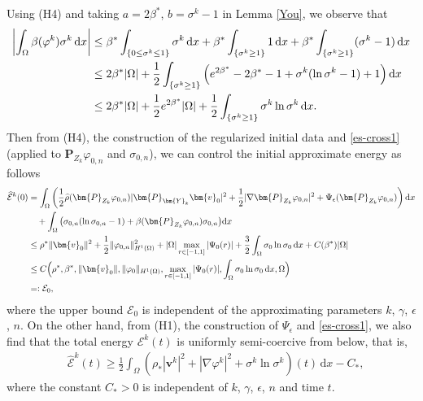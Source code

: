 \documentclass[11pt,reqno]{amsart}
\begin{document}
Using (H4) and taking $a=2\beta^*$, $b=\sigma^k-1$ in Lemma \ref{You}, we observe that
%
\begin{align}
\left|\int_\Omega \beta(\varphi^k) \sigma^k\,\mathrm{d}x\right|
&\leq \beta^*\int_{\{0\leq \sigma^k\leq 1\}} \sigma^k\,\mathrm{d}x
+ \beta^*\int_{\{\sigma^k\geq 1\}} 1\,\mathrm{d}x
+ \beta^*\int_{\{\sigma^k\geq 1\}} (\sigma^k-1)\,\mathrm{d}x
\notag \\
&\leq 2\beta^*|\Omega|
+ \frac{1}{2}\int_{\{\sigma^k\geq 1\}} \left(e^{2\beta^*}-2\beta^*-1 + \sigma^k
(\ln \sigma^k-1)+1\right)\mathrm{d}x
\notag\\
&\leq 2\beta^*|\Omega| + \frac{1}{2}e^{2\beta^*}|\Omega|
+ \frac{1}{2}\int_{\{\sigma^k\geq 1\}} \sigma^k
\ln \sigma^k\,\mathrm{d}x.
\label{es-cross1}
\end{align}
%
Then from (H4), the construction of the regularized initial data and \eqref{es-cross1} (applied to $\bm{P}_{Z_{k}} \varphi_{0,n}$ and $\sigma_{0,n}$), we can control the initial approximate energy as follows
%
\begin{align}
\widehat{\mathcal{E}}^k(0)
&=
\int_{\Omega}\left(\frac{1}{2}\widehat{\rho}(\bm{P}_{Z_{k}} \varphi_{0,n})|\bm{P}_{\bm{Y}_{k}} \bm{v}_{0}|^{2}
+\frac{1}{2}|\nabla \bm{P}_{Z_{k}}\varphi_{0,n}|^{2} +\Psi_\epsilon(\bm{P}_{Z_{k}}\varphi_{0,n})
 \right) \mathrm{d}x
\notag \\
&\quad +
\int_{\Omega}\big(
\sigma_{0,n}(\ln \sigma_{0,n}-1)
+ \beta(\bm{P}_{Z_{k}}\varphi_{0,n})\sigma_{0,n}\big) \mathrm{d}x
\notag \\
&\leq \rho^*\|\bm{v}_{0}\|^{2}
+ \frac12\|\varphi_{0,n}\|_{H^1(\Omega)}^2 + |\Omega|\max_{r\in[-1,1]}|\Psi_0(r)|
 + \frac{3}{2} \int_\Omega \sigma_0\ln \sigma_0\, \mathrm{d}x + C(\beta^*)  |\Omega|
\notag \\
&\le C\Big(\rho^*, \beta^*, \|  \bm{v}_{0}\|, \|\varphi_{0}\|_{H^1(\Omega)}, \max_{r\in[-1,1]}|\Psi_0(r)|,
\int_\Omega \sigma_0\ln \sigma_0\, \mathrm{d}x, \Omega\Big)
\notag\\
&=: \mathcal{E}_0,
\label{iniE0}
\end{align}
%
where the upper bound $\mathcal{E}_0$ is independent of the approximating parameters $k$, $\gamma$, $\epsilon$, $n$.
On the other hand, from (H1), the construction of $\Psi_\epsilon$ and \eqref{es-cross1}, we also find that the total energy $\mathcal{E}^k(t)$ is uniformly semi-coercive from below, that is,
%
\begin{align}
&\widehat{\mathcal{E}}^k(t)\geq \frac12 \int_{\Omega}\left( \rho_*|\boldsymbol{v}^k|^{2}
+ |\nabla \varphi^k|^{2}
+\sigma^k\ln \sigma^k
\right) (t) \,\mathrm{d} x -C_*,
\label{Lowerbd-2}
\end{align}
%
where the constant $C_*>0$ is independent of $k$, $\gamma$, $\epsilon$, $n$ and time $t$.
\end{document}
